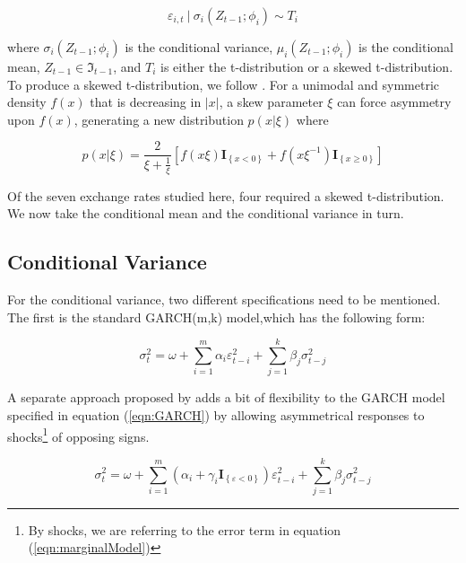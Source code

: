 \documentclass[12pt]{article}
\begin{document}
\begin{equation}
	\varepsilon_{i,t}~|~\sigma_{i}\left(Z_{t - 1}; \phi_{i}\right) \sim T_{i}
\end{equation}

where $\sigma_{i}\left(Z_{t - 1}; \phi_{i}\right)$ is the conditional variance, $\mu_{i}\left(Z_{t - 1}; \phi_{i}\right)$ is the conditional mean, $Z_{t - 1} \in \Im_{t-1}$, and $T_{i}$ is either the t-distribution or a skewed t-distribution. To produce a skewed t-distribution, we follow \cite{Fernandez_and_Steel_1998}. For a unimodal and symmetric density $f\left(x\right)$ that is decreasing in $\left\vert x\right\vert$, a skew parameter $\xi$ can force asymmetry upon $f\left(x\right)$, generating a new distribution $p\left(x|\xi\right)$ where

\begin{equation}
	p\left(x|\xi \right) = \frac{2}{\xi + \frac{1}{\xi}} \left[f\left(x\xi\right) \mathbf{I}_{\left\{x < 0\right\}} + f\left(x\xi^{-1}\right) \mathbf{I}_{\left\{x \geq 0\right\}}\right]
\end{equation}

Of the seven exchange rates studied here, four required a skewed t-distribution. We now take the conditional mean and the conditional variance in turn. 

\subsection{Conditional Variance}

For the conditional variance, two different specifications need to be mentioned. The first is the standard GARCH(m,k) model,which has the following form:

\begin{equation} \label{eqn:GARCH}
	\sigma_{t}^{2} = \omega + \sum_{i = 1}^{m}\alpha_{i} \varepsilon_{t - i}^{2} + \sum_{j = 1}^{k}\beta_{j} \sigma_{t - j}^{2}
\end{equation}

A separate approach proposed by \cite{GJR_1993} adds a bit of flexibility to the GARCH model specified in equation (\ref{eqn:GARCH}) by allowing asymmetrical responses to shocks\footnote{By shocks, we are referring to the error term in equation (\ref{eqn:marginalModel})} of opposing signs. 

\begin{equation}
	\sigma_{t}^{2} = \omega + \sum_{i = 1}^{m}\left(\alpha_{i} + \gamma_{i}\mathbf{I}_{\left\{\varepsilon < 0 \right\}}\right) \varepsilon_{t - i}^{2} + \sum_{j = 1}^{k}\beta_{j}\sigma_{t- j}^{2}
\end{equation}
\end{document}

